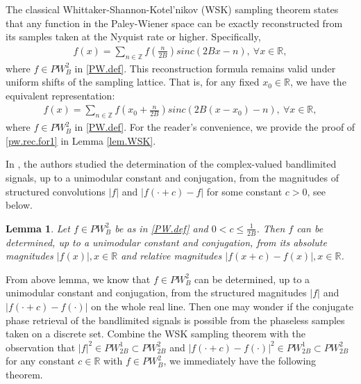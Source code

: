 \documentclass[12pt,oneside,reqno]{amsart}
\newtheorem{theorem}{Theorem}[section]
\newtheorem{lemma}[theorem]{Lemma}%
\newcommand{\Z}{\mathbb{Z}}
\newcommand{\R}{\mathbb{R}}
\numberwithin{equation}{section}
\begin{document}
The classical Whittaker-Shannon-Kotel'nikov (WSK) sampling theorem states that any function  in the Paley-Wiener space can be exactly reconstructed from its samples taken at the Nyquist rate or higher. Specifically, 
\begin{align*}
	f(x)=\sum_{n\in \Z} f(\frac{n}{2B}) sinc(2Bx-n), \ \forall x\in \R,
\end{align*}
where $f\in PW_B^2$ in \eqref{PW.def}. 
This reconstruction formula remains valid under uniform shifts of the sampling lattice. That is, for any fixed 
$x_0\in \R$, we have the equivalent representation:
\begin{align}\label{pw.rec.for1}
	f(x)=\sum_{n\in \Z} f(x_0+\frac{n}{2B}) sinc(2B(x-x_0)-n), \ \forall x\in \R,
\end{align}
where $f\in PW_B^2$ in \eqref{PW.def}. For the reader's convenience, we provide the proof of \eqref{pw.rec.for1} in Lemma \ref{lem.WSK}. %
%	


In \cite{mc2004phase}, the authors studied the determination of the  complex-valued bandlimited signals, up to a unimodular constant and conjugation,  from the magnitudes of structured convolutions $|f|$ and $|f(\cdot+c)-f|$ for some constant $c>0$, see below.  
\begin{lemma}\cite{mc2004phase}\label{lem2}
	Let $f\in PW^2_B$ be as in \eqref{PW.def} and $0<c\le \frac{1}{2B}$. Then $f$ can be determined, up to a unimodular constant and conjugation, from its absolute magnitudes $ |f(x)|, x\in \R $ and relative magnitudes $ |f(x + c)-f(x)|, x\in \R $.
\end{lemma}




From above lemma, we know that $f\in PW_B^2$ can be determined, up to a unimodular constant and conjugation, from the structured magnitudes $|f|$ and $|f(\cdot+ c)- f(\cdot)|$ on the whole real line. Then one may wonder if the conjugate phase retrieval of the bandlimited signals is possible from the phaseless samples taken on a discrete set. Combine the WSK sampling theorem with the observation that  $|f|^2\in PW_{2B}^1\subset PW_{2B}^2$ and $|f(\cdot+ c)- f(\cdot)|^2 \in PW_{2B}^1\subset PW_{2B}^2$ for any constant $c\in \R$ with $f\in PW_B^2$, we immediately have the following theorem.
\end{document}

